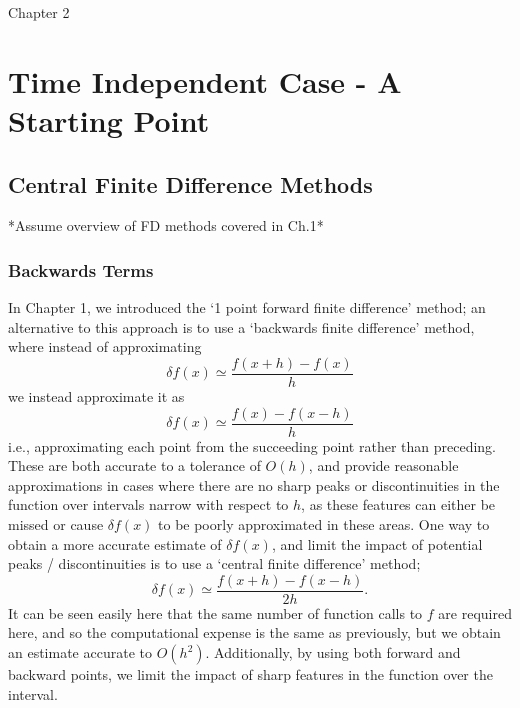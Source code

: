  Chapter 2

\chapter{Time Independent Case - A Starting Point} %

\label{Chapter2} %


\section{Central Finite Difference Methods}
*Assume overview of FD methods covered in Ch.1*
\subsection{Backwards Terms}
In Chapter 1, we introduced the `1 point forward finite difference' method; an alternative to this approach is to use a `backwards finite difference' method, where instead of approximating 
\begin{equation*}
    \delta f\left(x\right) \simeq \frac{f\left(x + h\right) - f\left(x\right)}{h}
\end{equation*}
we instead approximate it as 
\begin{equation*}
    \delta f\left(x\right) \simeq \frac{f\left(x\right) - f\left(x - h\right)}{h}
\end{equation*}
i.e., approximating each point from the succeeding point rather than preceding. 
These are both accurate to a tolerance of $O(h)$, and provide reasonable approximations in cases where there are no sharp peaks or discontinuities in the function over intervals narrow with respect to $h$, as these features can either be missed or cause $\delta f(x)$ to be poorly approximated in these areas. One way to obtain a more accurate estimate of $\delta f(x)$, and limit the impact of potential peaks / discontinuities is to use a `central finite difference' method;
\begin{equation*}
    \delta f\left(x\right) \simeq \frac{f\left(x + h\right) - f\left(x - h\right)}{2h}.
\end{equation*}
It can be seen easily here that the same number of function calls to $f$ are required here, and so the computational expense is the same as previously, but we obtain an estimate accurate to $O(h^{2})$. Additionally, by using both forward and backward points, we limit the impact of sharp features in the function over the interval.

